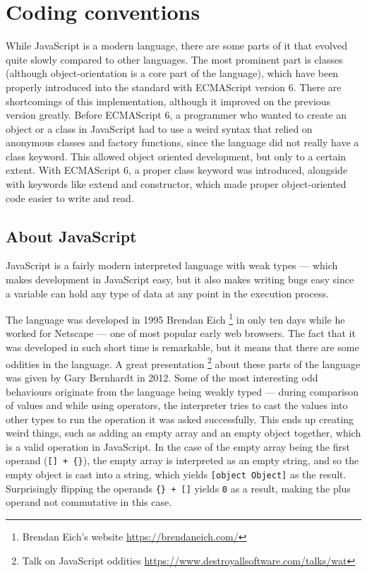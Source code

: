 \chapter{Coding conventions}\label{sect:Coding}
While JavaScript is a modern language, there are some parts of it that evolved quite slowly compared to other languages. The most prominent part is classes (although object-orientation is a core part of the language), which have been properly introduced into the standard with ECMAScript version 6. There are shortcomings of this implementation, although it improved on the previous version greatly. Before ECMAScript 6, a programmer who wanted to create an object or a class in JavaScript had to use a weird syntax that relied on anonymous classes and factory functions, since the language did not really have a class keyword. This allowed object oriented development, but only to a certain extent. With ECMAScript 6, a proper class keyword was introduced, alongside with keywords like extend and constructor, which made proper object-oriented code easier to write and read.
\section{About JavaScript}
JavaScript is a fairly modern interpreted language with weak types --- which makes development in JavaScript easy, but it also makes writing bugs easy since a variable can hold any type of data at any point in the execution process. 

The language was developed in 1995 Brendan Eich \footnote{Brendan Eich's website \url{https://brendaneich.com/}} in only ten days while he worked for Netscape --- one of most popular early web browsers. The fact that it was developed in such short time is remarkable, but it means that there are some oddities in the language. A great presentation \footnote{Talk on JavaScript oddities \url{https://www.destroyallsoftware.com/talks/wat}} about these parts of the language was given by Gary Bernhardt in 2012. Some of the most interesting odd behaviours originate from the language being weakly typed --- during comparison of values and while using operators, the interpreter tries to cast the values into other types to run the operation it was asked successfully. This ends up creating weird things, such as adding an empty array and an empty object together, which is a valid operation in JavaScript. In the case of the empty array being the first operand (\texttt{[] + \{\}}), the empty array is interpreted as an empty string, and so the empty object is cast into a string, which yields \texttt{[object Object]} as the result. Surprisingly flipping the operands \texttt{\{\} + []} yields \texttt{0} as a result, making the plus operand not commutative in this case.

